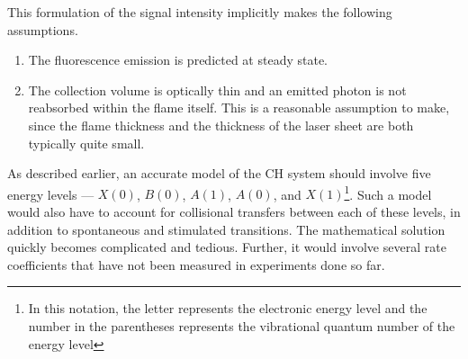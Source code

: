 This formulation of the signal intensity implicitly makes the following assumptions.
\begin{enumerate}
\item The fluorescence emission is predicted at steady state.
\item The collection volume is optically thin and an emitted photon is not reabsorbed within the flame itself.
This is a reasonable assumption to make, since the flame thickness and the thickness of the laser sheet are both typically quite small.
\end{enumerate}

As described earlier, an accurate model of the CH system should involve five energy levels --- \(X(0)\), \(B(0)\), \(A(1)\), \(A(0)\), and \(X(1)\)\footnote{In this notation, the letter represents the electronic energy level and the number in the parentheses represents the vibrational quantum number of the energy level}.
Such a model would also have to account for collisional transfers between each of these levels, in addition to spontaneous and stimulated transitions.
The mathematical solution quickly becomes complicated and tedious.
Further, it would involve several rate coefficients that have not been measured in experiments done so far.

